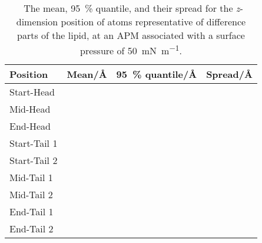 %
%
\begin{table}
\centering
\small
  \caption{\ The mean, \SI{95}{\percent} quantile, and their spread for the \emph{z}-dimension position of atoms representative of difference parts of the lipid, at an APM associated with a surface pressure of \SI{50}{\milli\newton\per\meter}.}
  \label{tab:spread}
  \begin{tabular}{llll}
    \hline
    Position & Mean/\si{\angstrom} & \SI{95}{\percent} quantile/\si{\angstrom} & Spread/\si{\angstrom} \\
    \hline
    Start-Head &  &  &  \\
    Mid-Head &  &  &  \\
    End-Head &  &  &  \\
    \hline
    Start-Tail 1 &  &  &  \\
    Start-Tail 2 &  &  &  \\
    Mid-Tail 1 &  &  &  \\
    Mid-Tail 2 &  &  &  \\
    End-Tail 1 &  &  &  \\
    End-Tail 2 &  &  &  \\
    \hline
  \end{tabular}
\end{table}
%
